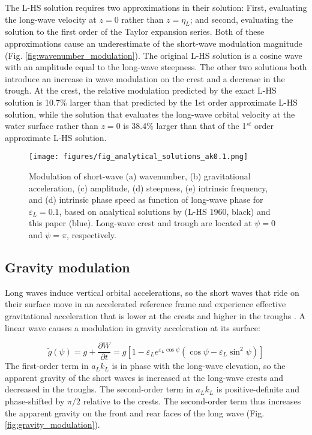 \documentclass[draft]{agujournal2019}
\begin{document}
The L-HS solution requires two approximations in their solution:
First, evaluating the long-wave velocity at $z = 0$
rather than $z = \eta_L$; and second, evaluating the solution to the first order
of the Taylor expansion series.
Both of these approximations cause an underestimate of the short-wave
modulation magnitude (Fig. \ref{fig:wavenumber_modulation}).
The original L-HS solution is a cosine wave with an amplitude equal
to the long-wave steepness.
The other two solutions both introduce an increase in wave modulation
on the crest and a decrease in the trough.
At the crest, the relative modulation predicted by the exact L-HS solution
is 10.7\% larger than that predicted by the 1st order approximate L-HS
solution, while the solution that evaluates the long-wave orbital velocity
at the water surface rather than $z = 0$ is 38.4\% larger than that of the
1$^{st}$ order approximate L-HS solution.

\begin{figure}[ht]
\label{fig:analytical_solutions_ak0.1}
\centering
\texttt{[image: figures/fig\_analytical\_solutions\_ak0.1.png]}
\caption{
  Modulation of short-wave (a) wavenumber, (b) gravitational acceleration,
  (c) amplitude, (d) steepness, (e) intrinsic frequency, and (d) intrinsic phase
  speed as function of long-wave phase for $\varepsilon_L = 0.1$, based on
  analytical solutions by  (L-HS 1960, black)
  and this paper (blue).
  Long-wave crest and trough are located at $\psi = 0$ and $\psi = \pi$,
  respectively.
}
\end{figure}

\subsection{Gravity modulation}
\label{subsection:gravity_modulation}

Long waves induce vertical orbital accelerations, so the short
waves that ride on their surface move in an accelerated reference frame and
experience effective gravitational acceleration that is lower at the crests and
higher in the troughs \cite{longuet1986eulerian,longuet1987propagation}.
A linear wave causes a modulation in gravity acceleration at its surface:

\begin{equation}
\label{eq:gravity_modulation_linear}
\widetilde{g}(\psi) = g + \dfrac{\partial W}{\partial t} = g \left[
  1 - \varepsilon_L e^{\varepsilon_L \cos{\psi}} \left(
    \cos{\psi} - \varepsilon_L \sin^2{\psi}
  \right)
\right]
\end{equation}
The first-order term in $a_L k_L$ is in phase with the long-wave elevation,
so the apparent gravity of the short waves is increased at the long-wave crests
and decreased in the troughs.
The second-order term in $a_L k_L$ is positive-definite and phase-shifted by
$\pi/2$ relative to the crests.
The second-order term thus increases the apparent gravity on the front and rear
faces of the long wave (Fig. \ref{fig:gravity_modulation}).
\end{document}

